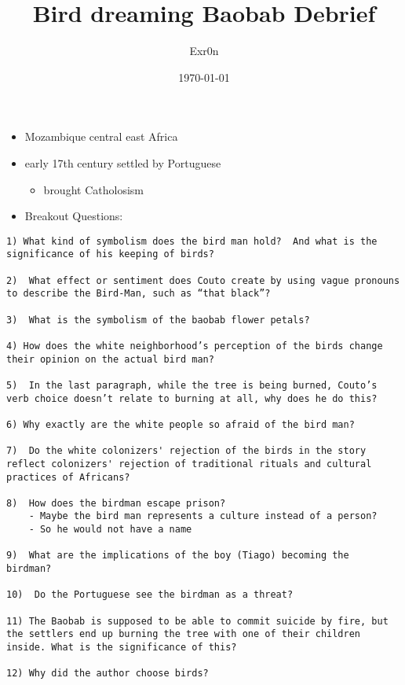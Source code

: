 \documentclass[letterpaper]{article}
\author{Exr0n}
\date{\today}
\title{Bird dreaming Baobab Debrief}
\renewcommand\maketitle{}
\begin{document}
\maketitle
\begin{itemize}
\item Mozambique central east Africa
\item early 17th century settled by Portuguese

\begin{itemize}
\item brought Catholosism
\end{itemize}

\item Breakout Questions:
\end{itemize}

\begin{verbatim}
1) What kind of symbolism does the bird man hold?  And what is the significance of his keeping of birds?

2)  What effect or sentiment does Couto create by using vague pronouns to describe the Bird-Man, such as “that black”? 

3)  What is the symbolism of the baobab flower petals? 

4) How does the white neighborhood’s perception of the birds change their opinion on the actual bird man? 

5)  In the last paragraph, while the tree is being burned, Couto’s verb choice doesn’t relate to burning at all, why does he do this?

6) Why exactly are the white people so afraid of the bird man? 

7)  Do the white colonizers' rejection of the birds in the story reflect colonizers' rejection of traditional rituals and cultural practices of Africans? 

8)  How does the birdman escape prison? 
    - Maybe the bird man represents a culture instead of a person?
    - So he would not have a name

9)  What are the implications of the boy (Tiago) becoming the birdman? 

10)  Do the Portuguese see the birdman as a threat? 

11) The Baobab is supposed to be able to commit suicide by fire, but the settlers end up burning the tree with one of their children inside. What is the significance of this?

12) Why did the author choose birds?
\end{verbatim}
\end{document}
